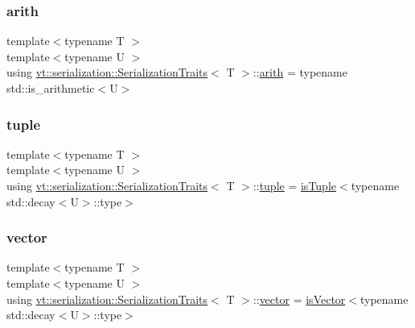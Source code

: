 \subsubsection{\texorpdfstring{arith}{arith}}
{\footnotesize\ttfamily template$<$typename T $>$ \\
template$<$typename U $>$ \\
using \hyperlink{structvt_1_1serialization_1_1_serialization_traits}{vt\+::serialization\+::\+Serialization\+Traits}$<$ T $>$\+::\hyperlink{structvt_1_1serialization_1_1_serialization_traits_abb1c9363540c1a2d8b6843f8910df5b4}{arith} =  typename std\+::is\+\_\+arithmetic$<$U$>$}

\mbox{\label{structvt_1_1serialization_1_1_serialization_traits_ab7e5dd1f060f8077a26dc1c539e7c4fa}} 
\subsubsection{\texorpdfstring{tuple}{tuple}}
{\footnotesize\ttfamily template$<$typename T $>$ \\
template$<$typename U $>$ \\
using \hyperlink{structvt_1_1serialization_1_1_serialization_traits}{vt\+::serialization\+::\+Serialization\+Traits}$<$ T $>$\+::\hyperlink{structvt_1_1serialization_1_1_serialization_traits_ab7e5dd1f060f8077a26dc1c539e7c4fa}{tuple} =  \hyperlink{structvt_1_1serialization_1_1is_tuple}{is\+Tuple}$<$typename std\+::decay$<$U$>$\+::type$>$}

\mbox{\label{structvt_1_1serialization_1_1_serialization_traits_a44712948817caf3f18d61fba6f6c1a18}} 
\subsubsection{\texorpdfstring{vector}{vector}}
{\footnotesize\ttfamily template$<$typename T $>$ \\
template$<$typename U $>$ \\
using \hyperlink{structvt_1_1serialization_1_1_serialization_traits}{vt\+::serialization\+::\+Serialization\+Traits}$<$ T $>$\+::\hyperlink{structvt_1_1serialization_1_1_serialization_traits_a44712948817caf3f18d61fba6f6c1a18}{vector} =  \hyperlink{structvt_1_1serialization_1_1is_vector}{is\+Vector}$<$typename std\+::decay$<$U$>$\+::type$>$}



